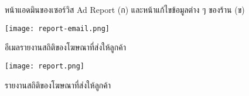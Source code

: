 \begin{figure}[!h]
	\centering
	\caption{หน้าแอดมินของเซอร์วิส Ad Report (ก) และหน้าแก้ไขข้อมูลต่าง ๆ ของร้าน (ข)}
	\label{Fig:adminui}
\end{figure}

\begin{figure}[!h]
	\centering
	\texttt{[image: report-email.png]}  
	\caption{อีเมลรายงานสถิติของโฆษณาที่ส่งให้ลูกค้า}
	\label{Fig:report-email}
\end{figure}

\begin{figure}[!p]
	\centering
	\texttt{[image: report.png]}  
	\caption{รายงานสถิติของโฆษณาที่ส่งให้ลูกค้า}
	\label{Fig:report}
\end{figure}
